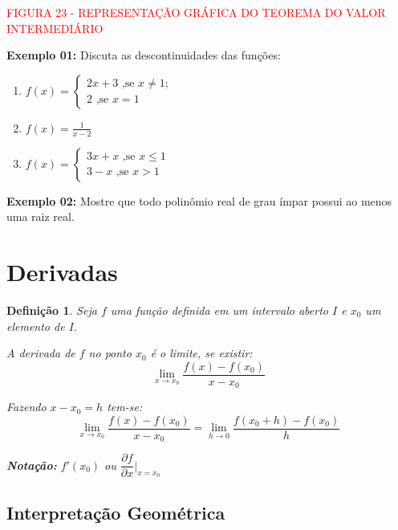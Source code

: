 \documentclass[oneside,a4paper,12pt]{article}
\newtheorem{definition}{Definição}[section]
\begin{document}
\vspace{150pt}
\begin{center}
	\textcolor{red}{FIGURA 23 - REPRESENTAÇÃO GRÁFICA DO TEOREMA DO VALOR INTERMEDIÁRIO}
\end{center}

{\bf Exemplo 01: }Discuta as descontinuidades das funções:
\begin{enumerate}
	\item $f(x) = \begin{cases}
	2x+3 \text{ ,se } x \neq 1;\\
	2 \text{ ,se }x = 1
	\end{cases}
	$
	\vspace{200pt}
	\item $f(x) = \frac{1}{x-2}$
	\vspace{200pt}
	\item $f(x) = \begin{cases}
	3x+x \text{ ,se } x \leq 1 \\
	3-x \text{ ,se } x > 1
	\end{cases}
	$
	\vspace{200pt}
\end{enumerate}
\newpage
{\bf Exemplo 02: }Mostre que todo polinômio real de grau ímpar possui ao menos uma raiz real.

\newpage

\section{Derivadas}

\begin{definition}
	Seja $f$ uma função definida em um intervalo aberto $I$ e $x_0$ um elemento de $I$.
	
	A derivada de $f$ no ponto $x_0$ é o limite, se existir:
	\begin{equation}
	\lim\limits_{x \rightarrow x_0}\frac{f(x) - f(x_0)}{x-x_0}
	\end{equation}
	
	Fazendo $x-x_0=h$ tem-se:
	\begin{equation}
	\lim\limits_{x \rightarrow x_0}\frac{f(x) - f(x_0)}{x-x_0} = \lim\limits_{h \rightarrow 0}\frac{f(x_0 + h)-f(x_0)}{h}
	\end{equation}	
	
	{\bf Notação:} $f'(x_0)$ ou $\dfrac{\partial f}{\partial x} |_{x=x_0}$
\end{definition}

\subsection{Interpretação Geométrica}
\end{document}
